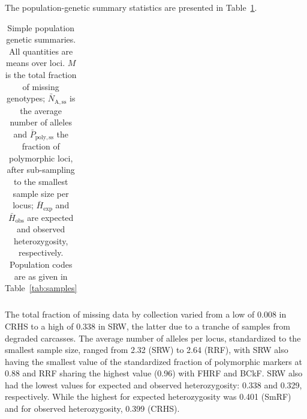 The population-genetic summary statistics are presented in Table~\ref{tab:pg-summ}.
\begin{table}
\caption{\footnotesize Simple population genetic summaries. All quantities are means
over loci.   $M$ is the total fraction of missing genotypes; $\bar{N}_\mathrm{A,ss}$ is the
average number of alleles and $\bar{P}_\mathrm{poly,ss}$ the fraction of polymorphic loci,
after sub-sampling to the smallest sample size per locus; $\bar{H}_\mathrm{exp}$ and
$\bar{H}_\mathrm{obs}$ are expected and observed heterozygosity, respectively. Population
codes are as given in Table~\ref{tab:samples}}
\label{tab:pg-summ}
{\footnotesize
\begin{tabular*}{0.48\textwidth}{@{\extracolsep{\fill}} lrrrrr}
\hline\hline

\end{tabular*}
}
\end{table}
The total fraction of missing data by collection varied from a low of
0.008  in CRHS to a high of 0.338 in SRW, the latter due to a tranche of
samples from degraded carcasses. The average number of alleles
per locus, standardized to the smallest sample size, ranged from 2.32 (SRW) to
2.64 (RRF), with  SRW also having the smallest value of the
standardized fraction of polymorphic markers at 0.88 and RRF sharing the highest value
(0.96) with FHRF and BCkF.
SRW also had the lowest values for expected and observed heterozygosity:
0.338 and 0.329, respectively. While the highest for expected heterozygosity
was 0.401 (SmRF) and for observed heterozygosity, 0.399 (CRHS).

